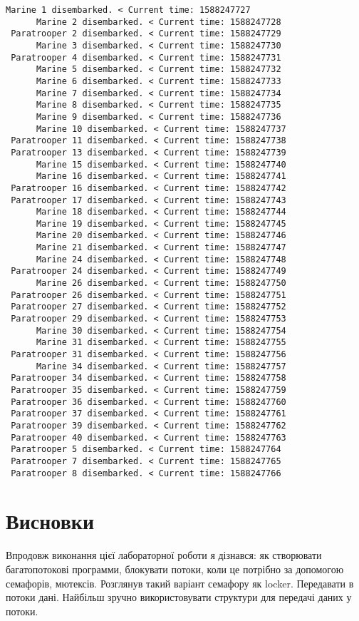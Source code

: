 \documentclass{article}
\begin{document}
\begin{lstlisting}[]
      Marine 1 disembarked. < Current time: 1588247727
      Marine 2 disembarked. < Current time: 1588247728
 Paratrooper 2 disembarked. < Current time: 1588247729
      Marine 3 disembarked. < Current time: 1588247730
 Paratrooper 4 disembarked. < Current time: 1588247731
      Marine 5 disembarked. < Current time: 1588247732
      Marine 6 disembarked. < Current time: 1588247733
      Marine 7 disembarked. < Current time: 1588247734
      Marine 8 disembarked. < Current time: 1588247735
      Marine 9 disembarked. < Current time: 1588247736
      Marine 10 disembarked. < Current time: 1588247737
 Paratrooper 11 disembarked. < Current time: 1588247738
 Paratrooper 13 disembarked. < Current time: 1588247739
      Marine 15 disembarked. < Current time: 1588247740
      Marine 16 disembarked. < Current time: 1588247741
 Paratrooper 16 disembarked. < Current time: 1588247742
 Paratrooper 17 disembarked. < Current time: 1588247743
      Marine 18 disembarked. < Current time: 1588247744
      Marine 19 disembarked. < Current time: 1588247745
      Marine 20 disembarked. < Current time: 1588247746
      Marine 21 disembarked. < Current time: 1588247747
      Marine 24 disembarked. < Current time: 1588247748
 Paratrooper 24 disembarked. < Current time: 1588247749
      Marine 26 disembarked. < Current time: 1588247750
 Paratrooper 26 disembarked. < Current time: 1588247751
 Paratrooper 27 disembarked. < Current time: 1588247752
 Paratrooper 29 disembarked. < Current time: 1588247753
      Marine 30 disembarked. < Current time: 1588247754
      Marine 31 disembarked. < Current time: 1588247755
 Paratrooper 31 disembarked. < Current time: 1588247756
      Marine 34 disembarked. < Current time: 1588247757
 Paratrooper 34 disembarked. < Current time: 1588247758
 Paratrooper 35 disembarked. < Current time: 1588247759
 Paratrooper 36 disembarked. < Current time: 1588247760
 Paratrooper 37 disembarked. < Current time: 1588247761
 Paratrooper 39 disembarked. < Current time: 1588247762
 Paratrooper 40 disembarked. < Current time: 1588247763
 Paratrooper 5 disembarked. < Current time: 1588247764
 Paratrooper 7 disembarked. < Current time: 1588247765
 Paratrooper 8 disembarked. < Current time: 1588247766

\end{lstlisting}

\newpage
\section{Висновки}
\large
Впродовж виконання цієї лабораторної роботи я дізнався: як створювати багатопотокові программи, блокувати потоки, коли це потрібно за допомогою семафорів, мютексів. Розглянув такий варіант семафору як locker. Передавати в потоки дані. Найбільш зручно використовувати структури для передачі даних у потоки.
\end{document}
